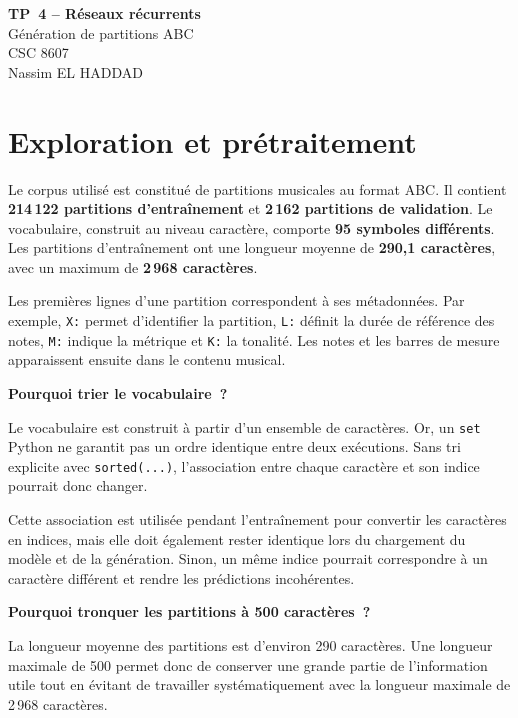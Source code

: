 \documentclass[11pt,a4paper]{article}
\begin{document}
\begin{center}
  {\LARGE\bfseries TP~4 -- Réseaux récurrents}\\[0.35cm]
  {\large Génération de partitions ABC}\\[0.35cm]
  {\large CSC 8607}\\[0.6cm]
  Nassim EL HADDAD
\end{center}
\vspace{0.4cm}

\section{Exploration et prétraitement}

Le corpus utilisé est constitué de partitions musicales au format ABC.
Il contient \textbf{214\,122 partitions d'entraînement} et
\textbf{2\,162 partitions de validation}.
Le vocabulaire, construit au niveau caractère, comporte
\textbf{95 symboles différents}.
Les partitions d'entraînement ont une longueur moyenne de
\textbf{290,1 caractères}, avec un maximum de
\textbf{2\,968 caractères}.

Les premières lignes d'une partition correspondent à ses métadonnées.
Par exemple, \texttt{X:} permet d'identifier la partition,
\texttt{L:} définit la durée de référence des notes,
\texttt{M:} indique la métrique et \texttt{K:} la tonalité.
Les notes et les barres de mesure apparaissent ensuite dans le contenu
musical.

\textbf{Pourquoi trier le vocabulaire~?}

Le vocabulaire est construit à partir d'un ensemble de caractères.
Or, un \texttt{set} Python ne garantit pas un ordre identique entre
deux exécutions. Sans tri explicite avec \texttt{sorted(...)},
l'association entre chaque caractère et son indice pourrait donc changer.

Cette association est utilisée pendant l'entraînement pour convertir
les caractères en indices, mais elle doit également rester identique
lors du chargement du modèle et de la génération. Sinon, un même indice
pourrait correspondre à un caractère différent et rendre les prédictions
incohérentes.

\textbf{Pourquoi tronquer les partitions à 500 caractères~?}

La longueur moyenne des partitions est d'environ 290 caractères.
Une longueur maximale de 500 permet donc de conserver une grande partie
de l'information utile tout en évitant de travailler systématiquement
avec la longueur maximale de 2\,968 caractères.
\end{document}

